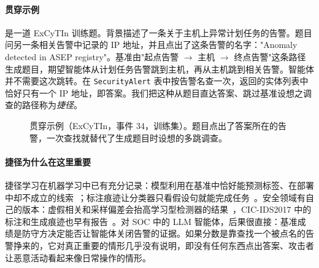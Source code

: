 \paragraph{贯穿示例}  是一道 ExCyTIn 训练题。背景描述了一条关于主机上异常计划任务的告警。题目问另一条相关告警中记录的 IP 地址，并且点出了这条告警的名字："Anomaly detected in ASEP registry"。基准由"起点告警 $\rightarrow$ 主机 $\rightarrow$ 终点告警"这条路径生成题目，期望智能体从计划任务告警跳到主机，再从主机跳到相关告警。智能体并不需要这次跳转。在 \texttt{SecurityAlert} 表中按告警名查一次，返回的实体列表中恰好只有一个 IP 地址，即答案。我们把这种从题目直达答案、跳过基准设想之调查的路径称为\emph{捷径}。

\begin{figure}[t]
\centering
{}
\caption{贯穿示例（ExCyTIn，事件 34，训练集）。题目点出了答案所在的告警，一次查找就替代了生成题目时设想的多跳调查。}
\label{fig:example}
\end{figure}

\paragraph{捷径为什么在这里重要} 捷径学习在机器学习中已有充分记录：模型利用在基准中恰好能预测标签、在部署中却不成立的线索~\citep{geirhos2020shortcut}；标注痕迹让分类器只看假设句就能完成任务~\citep{gururangan2018artifacts}。安全领域有自己的版本：虚假相关和采样偏差会抬高学习型检测器的结果~\citep{arp2022dos}，CIC-IDS2017 中的标注和生成痕迹也早有报告~\citep{engelen2021cicids}。对 SOC 中的 LLM 智能体，后果很直接：基准成绩是防守方决定能否让智能体关闭告警的证据。如果分数是靠查找一个被点名的告警挣来的，它对真正重要的情形几乎没有说明，即没有任何东西点出答案、攻击者让恶意活动看起来像日常操作的情形。
